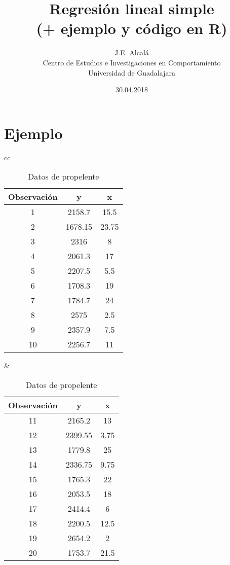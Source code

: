 \documentclass[letterpaper,12pt]{article}
\title{Regresión lineal simple\\ 
	\normalsize(+ ejemplo y código en R)}
\author{J.E. Alcal\'a\\
	    Centro de Estudios e Investigaciones en Comportamiento\\
		Universidad de Guadalajara}
\date{30.04.2018}
\begin{document}
	\maketitle	
	
\section*{Ejemplo}

\begin{center}
	\begin{table}[htpb] 
	\caption{Datos de propelente}
	\label{tabla_1}
		\begin{tabular}{cc}
			\begin{minipage}{.5\linewidth}
				\centering
				\begin{tabular}{ccc}
		\hline \rowcolor[HTML]{EFEFEF} 
		Observación & y & x \\ \hline
		1 & 2158.7 & 15.5 \\
		2 & 1678.15 & 23.75 \\
		3 & 2316 & 8 \\
		4 & 2061.3 & 17 \\
		5 & 2207.5 & 5.5 \\
		6 & 1708.3 & 19 \\
		7 & 1784.7 & 24 \\
		8 & 2575 & 2.5 \\
		9 & 2357.9 & 7.5 \\
		10 & 2256.7 & 11 \\\hline
				\end{tabular}
		\end{minipage} &

		\begin{minipage}{.5\linewidth}
	\centering
	\begin{tabular}{ccc}
		\hline \rowcolor[HTML]{EFEFEF} 
		Observación & y & x \\\hline
		11 & 2165.2 & 13 \\
		12 & 2399.55 & 3.75 \\
		13 & 1779.8 & 25 \\
		14 & 2336.75 & 9.75 \\
		15 & 1765.3 & 22 \\
		16 & 2053.5 & 18 \\
		17 & 2414.4 & 6 \\
		18 & 2200.5 & 12.5 \\
		19 & 2654.2 & 2 \\
		20 & 1753.7 & 21.5\\ \hline
		\end{tabular}
	\end{minipage} 
	\end{tabular}
 \end{table}
\end{center}
\end{document}
